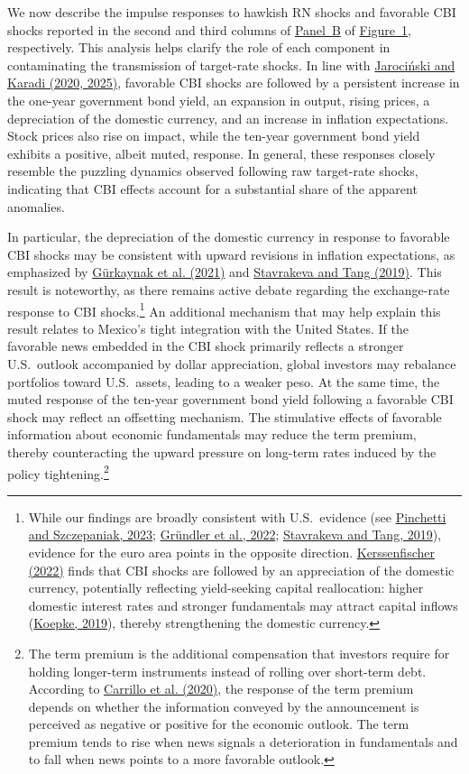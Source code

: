 \documentclass[12pt, reqno]{article}
\begin{document}
We now describe the impulse responses to hawkish RN shocks and favorable CBI shocks reported in the second and third columns of \hyperlink{Panel BF1}{Panel~B} of \hyperlink{Figure~1}{Figure~1}, respectively. This analysis helps clarify the role of each component in contaminating the transmission of target-rate shocks. In line with \hyperlink{Jarociński and Karadi (2025)}{Jarociński and Karadi (2020, 2025)}, favorable CBI shocks are followed by a persistent increase in the one-year government bond yield, an expansion in output, rising prices, a depreciation of the domestic currency, and an increase in inflation expectations. Stock prices also rise on impact, while the ten-year government bond yield exhibits a positive, albeit muted, response. In general, these responses closely resemble the puzzling dynamics observed following raw target-rate shocks, indicating that CBI effects account for a substantial share of the apparent anomalies.

In particular, the depreciation of the domestic currency in response to favorable CBI shocks may be consistent with upward revisions in inflation expectations, as emphasized by \hyperlink{Gurkaynak et al. (2021)}{G\"urkaynak et al. (2021)} and \hyperlink{Stavrakeva and Tang (2019)}{Stavrakeva and Tang (2019)}. This result is noteworthy, as there remains active debate regarding the exchange-rate response to CBI shocks.\footnote{While our findings are broadly consistent with U.S.\ evidence (see \hyperlink{Pinchetti and Szczepaniak (2023)}{Pinchetti and Szczepaniak, 2023}; \hyperlink{Gründler et al. (2022)}{Gr\"undler et al., 2022}; \hyperlink{Stavrakeva and Tang (2019)}{Stavrakeva and Tang, 2019}), evidence for the euro area points in the opposite direction. \hyperlink{Kerssenfischer (2022)}{Kerssenfischer (2022)} finds that CBI shocks are followed by an appreciation of the domestic currency, potentially reflecting yield-seeking capital reallocation: higher domestic interest rates and stronger fundamentals may attract capital inflows (\hyperlink{Koepke (2019)}{Koepke, 2019}), thereby strengthening the domestic currency.} An additional mechanism that may help explain this result relates to Mexico’s tight integration with the United States. If the favorable news embedded in the CBI shock primarily reflects a stronger U.S.\ outlook accompanied by dollar appreciation, global investors may rebalance portfolios toward U.S.\ assets, leading to a weaker peso. At the same time, the muted response of the ten-year government bond yield following a favorable CBI shock may reflect an offsetting mechanism. The stimulative effects of favorable information about economic fundamentals may reduce the term premium, thereby counteracting the upward pressure on long-term rates induced by the policy tightening.\footnote{The term premium is the additional compensation that investors require for holding longer-term instruments instead of rolling over short-term debt. According to \hyperlink{Carrillo et al. (2020)}{Carrillo et al. (2020)}, the response of the term premium depends on whether the information conveyed by the announcement is perceived as negative or positive for the economic outlook. The term premium tends to rise when news signals a deterioration in fundamentals and to fall when news points to a more favorable outlook.}
\end{document}
